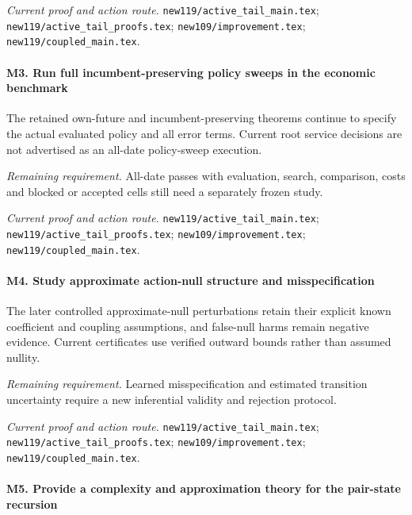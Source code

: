 \par\emph{Current proof and action route.} \nolinkurl{new119/active_tail_main.tex}; \nolinkurl{new119/active_tail_proofs.tex}; \nolinkurl{new109/improvement.tex}; \nolinkurl{new119/coupled_main.tex}.

\paragraph{M3. Run full incumbent-preserving policy sweeps in the economic benchmark}

The retained own-future and incumbent-preserving theorems continue to specify the actual evaluated policy and all error terms. Current root service decisions are not advertised as an all-date policy-sweep execution.

\par\emph{Remaining requirement.} All-date passes with evaluation, search, comparison, costs and blocked or accepted cells still need a separately frozen study.

\par\emph{Current proof and action route.} \nolinkurl{new119/active_tail_main.tex}; \nolinkurl{new119/active_tail_proofs.tex}; \nolinkurl{new109/improvement.tex}; \nolinkurl{new119/coupled_main.tex}.

\paragraph{M4. Study approximate action-null structure and misspecification}

The later controlled approximate-null perturbations retain their explicit known coefficient and coupling assumptions, and false-null harms remain negative evidence. Current certificates use verified outward bounds rather than assumed nullity.

\par\emph{Remaining requirement.} Learned misspecification and estimated transition uncertainty require a new inferential validity and rejection protocol.

\par\emph{Current proof and action route.} \nolinkurl{new119/active_tail_main.tex}; \nolinkurl{new119/active_tail_proofs.tex}; \nolinkurl{new109/improvement.tex}; \nolinkurl{new119/coupled_main.tex}.

\paragraph{M5. Provide a complexity and approximation theory for the pair-state recursion}

